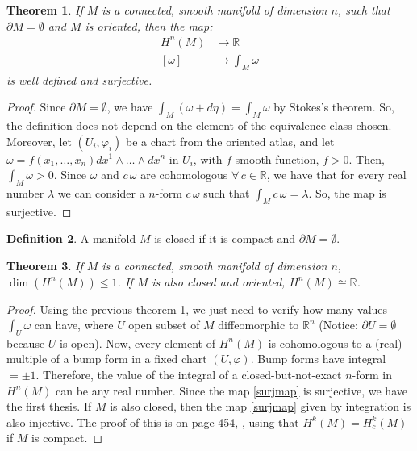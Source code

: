 \documentclass[a4paper,11pt,titlepage, article, oneside]{memoir}
\numberwithin{equation}{section}
\newtheorem{theorem}{Theorem}[section]
\theoremstyle{definition}
\newtheorem{definition}[theorem]{Definition}
\theoremstyle{remark}
\newcommand{\rfield}{\mathbb{R}}
\begin{document}
\begin{theorem} \label{surjintegral}
If $M$ is a connected, smooth manifold of dimension $n$, such that $\partial M = \emptyset$ and $M$ is oriented, then the map:
\begin{align} \label{surjmap}
H^n(M) &\rightarrow \rfield \\
[\omega] &\mapsto \int_M \omega \nonumber
\end{align}
is well defined and surjective.
\end{theorem}
\begin{proof}
Since $\partial M = \emptyset$, we have $\int_M (\omega + d \eta) = \int_M \omega$ by Stokes's theorem. So, the definition does not depend on the element of the equivalence class chosen. Moreover, let $(U_i, \varphi_i)$  be a chart from the oriented atlas, and let $\omega=f(x_1, \ldots, x_n) dx^1 \wedge \ldots \wedge dx^n$ in $U_i$, with $f$ smooth function, $f > 0$. Then, $\int_M \omega > 0$. Since $\omega$ and $c \, \omega$ are cohomologous $\forall \, c \in \rfield$, we have that for every real number $\lambda$ we can consider a $n$-form $c\,  \omega$ such that $\int_M c\, \omega = \lambda$. So, the map is surjective.
\end{proof}

\begin{definition} \label{closedman}
A manifold $M$ is closed if it is compact and $\partial M = \emptyset$.
\end{definition}

\begin{theorem} \label{1dimthm}
If $M$ is a connected, smooth manifold of dimension $n$, $\dim \left( H^n(M) \right) \le 1$. If $M$ is also closed and oriented, $H^n(M) \cong \rfield$.
\end{theorem}
\begin{proof}
Using the previous theorem \ref{surjintegral}, we just need to verify how many values $\int_U \omega$ can have, where $U$ open subset of $M$ diffeomorphic to $\rfield^n$ (Notice: $\partial U = \emptyset$ because $U$ is open). Now, every element of $H^n(M)$ is cohomologous to a (real) multiple of  a bump form in a fixed chart $(U, \varphi)$. Bump forms have integral $ =\pm 1$. Therefore, the value of the integral of a closed-but-not-exact $n$-form in $H^n(M)$ can be any real number. Since the map \eqref{surjmap} is surjective, we have the first thesis. If $M$ is also closed, then the map \eqref{surjmap} given by integration is also injective. The proof of this is on page 454, , using that $H^k(M)=H_c^k(M)$ if $M$ is compact. 
\end{proof}
\end{document}
